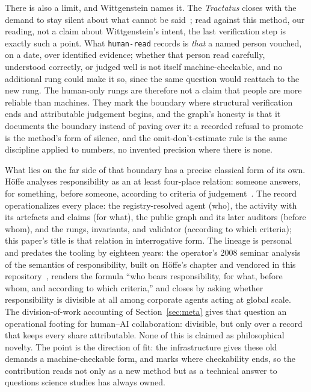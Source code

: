 There is also a limit, and Wittgenstein names it. The
\emph{Tractatus} closes with the demand to stay silent about what
cannot be said~\cite{wittgenstein-tractatus}; read against this
method, our reading, not a claim about Wittgenstein's intent, the
last verification step is exactly such a point. What
\texttt{human-read} records is \emph{that} a named person vouched,
on a date, over identified evidence; whether that person read
carefully, understood correctly, or judged well is not itself
machine-checkable, and no additional rung could make it so, since
the same question would reattach to the new rung. The human-only
rungs are therefore not a claim that people are more reliable than
machines. They mark the boundary where structural verification ends
and attributable judgement begins, and the graph's honesty is that
it documents the boundary instead of paving over it: a recorded
refusal to promote is the method's form of silence, and the
omit-don't-estimate rule is the same discipline applied to numbers,
no invented precision where there is none.

What lies on the far side of that boundary has a precise classical
form of its own. H\"offe analyses responsibility as an at least
four-place relation: someone answers, for something, before someone,
according to criteria of judgement~\cite{hoeffe1993}. The record
operationalizes every place: the registry-resolved agent (who), the
activity with its artefacts and claims (for what), the public graph
and its later auditors (before whom), and the rungs, invariants, and
validator (according to which criteria); this paper's title is that
relation in interrogative form. The lineage is personal and predates
the tooling by eighteen years: the operator's 2008 seminar analysis
of the semantics of responsibility, built on H\"offe's chapter and
vendored in this repository~\cite{verantwortung2008}, renders the
formula ``who bears responsibility, for what, before whom, and
according to which criteria,'' and closes by asking whether
responsibility is divisible at all among corporate agents acting at
global scale. The division-of-work accounting of
Section~\ref{sec:meta} gives that question an operational footing
for human--AI collaboration: divisible, but only over a record that
keeps every share attributable. None of this is claimed
as philosophical novelty. The point is the direction of fit: the
infrastructure gives these old demands a machine-checkable form,
and marks where checkability ends, so the contribution reads not
only as a new method but as a technical answer to questions science
studies has always owned.
